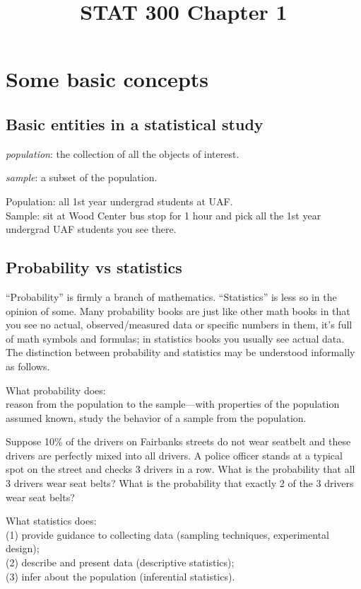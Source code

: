 \documentclass[12pt]{article}
\begin{document}
\title{STAT 300 Chapter 1}
\maketitle

\section{Some basic concepts}

\subsection{Basic entities in a statistical study}

\emph{population}: the collection of all the objects of interest.

\emph{sample}: a subset of the population.

\example
Population: all 1st year undergrad students at UAF.\\
Sample: sit at Wood Center bus stop for 1 hour and pick all the 1st year
undergrad UAF students you see there.

\subsection{Probability vs statistics}

``Probability'' is firmly a branch of mathematics.
``Statistics'' is less so in the opinion of some.
Many probability books are just like other math books in that
you see no actual, observed/measured data or specific numbers in them,
it's full of math symbols and formulas;
in statistics books you usually see actual data.
The distinction between probability and statistics may be understood
informally as follows.

What probability does:\\
reason from the population to the sample---with properties
of the population assumed known, study the behavior of a sample from the
population.

\example Suppose 10\% of the drivers on Fairbanks streets do not wear
seatbelt and these drivers are perfectly mixed into all drivers.
A police officer stands at a typical spot on the street and checks 3
drivers in a row.
What is the probability that all 3 drivers wear seat belts?
What is the probability that exactly 2 of the 3 drivers wear seat belts?

What statistics does:\\
(1) provide guidance to collecting data (sampling techniques,
experimental design);\\
(2) describe and present data (descriptive statistics);\\
(3) infer about the population (inferential statistics).
\end{document}

